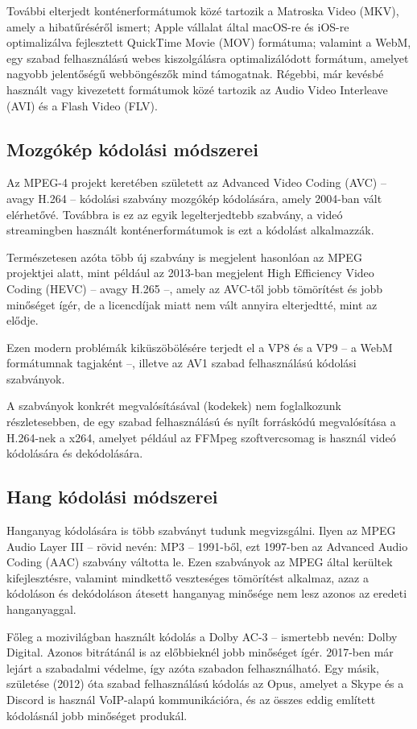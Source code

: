 További elterjedt konténerformátumok közé tartozik a Matroska Video (MKV), amely a hibatűréséről ismert; Apple vállalat által macOS-re és iOS-re optimalizálva fejlesztett QuickTime Movie (MOV) formátuma; valamint a WebM, egy szabad felhasználású webes kiszolgálásra optimalizálódott formátum, amelyet nagyobb jelentőségű webböngészők mind támogatnak. Régebbi, már kevésbé használt vagy kivezetett formátumok közé tartozik az Audio Video Interleave (AVI) és a Flash Video (FLV).

\subsection{Mozgókép kódolási módszerei}

Az MPEG-4 projekt keretében született az Advanced Video Coding (AVC) -- avagy H.264 -- kódolási szabvány mozgókép kódolására, amely 2004-ban vált elérhetővé. Továbbra is ez az egyik legelterjedtebb szabvány, a videó streamingben használt konténerformátumok is ezt a kódolást alkalmazzák.

Természetesen azóta több új szabvány is megjelent hasonlóan az MPEG projektjei alatt, mint például az 2013-ban megjelent High Efficiency Video Coding (HEVC) -- avagy H.265 --, amely az AVC-től jobb tömörítést és jobb minőséget ígér, de a licencdíjak miatt nem vált annyira elterjedtté, mint az elődje.

Ezen modern problémák kiküszöbölésére terjedt el a VP8 és a VP9 -- a WebM formátumnak tagjaként --, illetve az AV1 szabad felhasználású kódolási szabványok.

A szabványok konkrét megvalósításával (kodekek) nem foglalkozunk részletesebben, de egy szabad felhasználású és nyílt forráskódú megvalósítása a H.264-nek a x264, amelyet például az FFMpeg szoftvercsomag is használ videó kódolására és dekódolására.

\subsection{Hang kódolási módszerei}

Hanganyag kódolására is több szabványt tudunk megvizsgálni. Ilyen az MPEG Audio Layer III -- rövid nevén: MP3 -- 1991-ből, ezt 1997-ben az Advanced Audio Coding (AAC) szabvány váltotta le. Ezen szabványok az MPEG által kerültek kifejlesztésre, valamint mindkettő veszteséges tömörítést alkalmaz, azaz a kódoláson és dekódoláson átesett hanganyag minősége nem lesz azonos az eredeti hanganyaggal.

Főleg a mozivilágban használt kódolás a Dolby AC-3 -- ismertebb nevén: Dolby Digital. Azonos bitrátánál is az előbbieknél jobb minőséget ígér. 2017-ben már lejárt a szabadalmi védelme, így azóta szabadon felhasználható. Egy másik, születése (2012) óta szabad felhasználású kódolás az Opus, amelyet a Skype és a Discord is használ VoIP-alapú kommunikációra, és az összes eddig említett kódolásnál jobb minőséget produkál.

